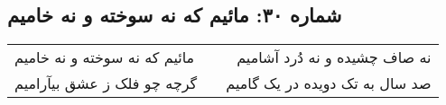 \begin{center}
\section*{شماره ۳۰: مائیم که نه سوخته و نه خامیم}
\label{sec:030}
\begin{longtable}{l p{0.5cm} r}
مائیم که نه سوخته و نه خامیم
&&
نه صاف چشیده و نه دُرد آشامیم
\\
گرچه چو فلک ز عشق بیآرامیم
&&
صد سال به تک دویده در یک گامیم
\\
\end{longtable}
\end{center}
